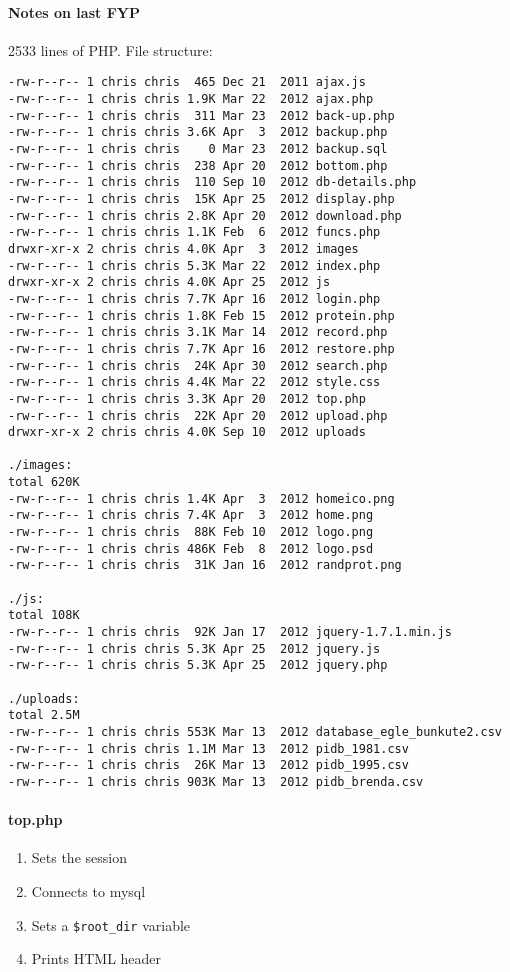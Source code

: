 \paragraph{Notes on last FYP} 2533 lines of PHP. File structure:
\begin{verbatim}
-rw-r--r-- 1 chris chris  465 Dec 21  2011 ajax.js
-rw-r--r-- 1 chris chris 1.9K Mar 22  2012 ajax.php
-rw-r--r-- 1 chris chris  311 Mar 23  2012 back-up.php
-rw-r--r-- 1 chris chris 3.6K Apr  3  2012 backup.php
-rw-r--r-- 1 chris chris    0 Mar 23  2012 backup.sql
-rw-r--r-- 1 chris chris  238 Apr 20  2012 bottom.php
-rw-r--r-- 1 chris chris  110 Sep 10  2012 db-details.php
-rw-r--r-- 1 chris chris  15K Apr 25  2012 display.php
-rw-r--r-- 1 chris chris 2.8K Apr 20  2012 download.php
-rw-r--r-- 1 chris chris 1.1K Feb  6  2012 funcs.php
drwxr-xr-x 2 chris chris 4.0K Apr  3  2012 images
-rw-r--r-- 1 chris chris 5.3K Mar 22  2012 index.php
drwxr-xr-x 2 chris chris 4.0K Apr 25  2012 js
-rw-r--r-- 1 chris chris 7.7K Apr 16  2012 login.php
-rw-r--r-- 1 chris chris 1.8K Feb 15  2012 protein.php
-rw-r--r-- 1 chris chris 3.1K Mar 14  2012 record.php
-rw-r--r-- 1 chris chris 7.7K Apr 16  2012 restore.php
-rw-r--r-- 1 chris chris  24K Apr 30  2012 search.php
-rw-r--r-- 1 chris chris 4.4K Mar 22  2012 style.css
-rw-r--r-- 1 chris chris 3.3K Apr 20  2012 top.php
-rw-r--r-- 1 chris chris  22K Apr 20  2012 upload.php
drwxr-xr-x 2 chris chris 4.0K Sep 10  2012 uploads

./images:
total 620K
-rw-r--r-- 1 chris chris 1.4K Apr  3  2012 homeico.png
-rw-r--r-- 1 chris chris 7.4K Apr  3  2012 home.png
-rw-r--r-- 1 chris chris  88K Feb 10  2012 logo.png
-rw-r--r-- 1 chris chris 486K Feb  8  2012 logo.psd
-rw-r--r-- 1 chris chris  31K Jan 16  2012 randprot.png

./js:
total 108K
-rw-r--r-- 1 chris chris  92K Jan 17  2012 jquery-1.7.1.min.js
-rw-r--r-- 1 chris chris 5.3K Apr 25  2012 jquery.js
-rw-r--r-- 1 chris chris 5.3K Apr 25  2012 jquery.php

./uploads:
total 2.5M
-rw-r--r-- 1 chris chris 553K Mar 13  2012 database_egle_bunkute2.csv
-rw-r--r-- 1 chris chris 1.1M Mar 13  2012 pidb_1981.csv
-rw-r--r-- 1 chris chris  26K Mar 13  2012 pidb_1995.csv
-rw-r--r-- 1 chris chris 903K Mar 13  2012 pidb_brenda.csv
\end{verbatim}

\paragraph{top.php}
\begin{enumerate}
\item Sets the session
\item Connects to mysql
\item Sets a \texttt{\$root\_dir} variable
\item Prints HTML header
\end{enumerate}

